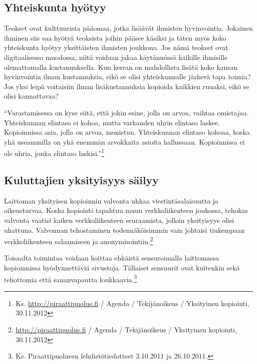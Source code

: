 \documentclass[titlepage,12pt]{article}
\begin{document}
\subsection{Yhteiskunta hyötyy}



Teokset ovat kulttuurista pääomaa, jotka lisäävät ihmisten
hyvinvointia.  Jokainen ihminen siis saa hyötyä teoksista joihin
pääsee käsiksi ja täten myös koko yhteiskunta hyötyy yksittäisten
ihmisten joukkona.  Jos nämä teokset ovat digitaalisessa muodossa,
niitä voidaan jakaa käytännössä kaikille ihmisille olemattomalla
kustannuksella.  Kun kerran on mahdollista lisätä koko kansan
hyvinvointia ilman kustannuksia, eikö se olisi yhteiskunnalle järkevä
tapa toimia?  Jos yksi leipä voitaisiin ilman lisäkustannuksia
kopioida kaikkien ruuaksi, eikö se olisi kannattavaa?

``Varastamisessa on kyse siitä, että jokin esine, jolla on arvoa,
vaihtaa omistajaa.  Yhteiskunnan elintaso ei kohoa, mutta varkauden
uhrin elintaso laskee. Kopioinnissa asia, jolla on arvoa, monistuu.
Yhteiskunnan elintaso kohoaa, koska yhä useammilla on yhä enemmän
arvokkaita asioita hallussaan.  Kopioinnissa ei ole uhria, jonka
elintaso laskisi.''\footnote{Ks. \url{http://piraattipuolue.fi} /
  Agenda / Tekijänoikeus / Yksityinen kopiointi, 30.11.2012}

\subsection{Kuluttajien yksityisyys säilyy}

Laittoman yksityisen kopioinnin valvonta uhkaa viestintäsalaisuutta ja
oikeusturvaa.  Koska kopiointi tapahtuu muun verkkoliikenteen
joukossa, tehokas valvonta vaatisi kaiken verkkoliikenteen
seuraamista, jolloin yksityisyys olisi uhattuna.  Valvonnan
tehostaminen todennäköisimmin vain johtaisi tiukempaan
verkkoliikenteen salaamiseen ja
anonymisointiin.\footnote{\url{http://piraattipuolue.fi} / Agenda /
  Tekijänoikeus / Yksityinen kopiointi, 30.11.2012} 

Toisaalta toimintaa voidaan koittaa ehkäistä sensuroimalla laittomassa
kopioinnissa hyödynnettäviä sivustoja. %
Tällaiset sensuurit ovat kuitenkin sekä tehottomia että sananvapautta
loukkaavia.\footnote{Ks. Piraattipuolueen lehdistötiedotteet 3.10.2011
  ja 26.10.2011.}
\end{document}
